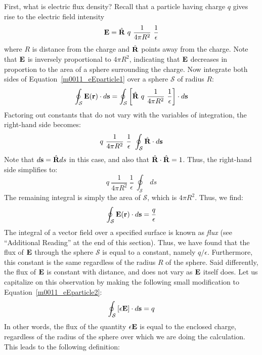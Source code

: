 First, what is electric flux density?
Recall that a particle having charge $q$ gives rise to the electric field intensity
%
\begin{equation}
{\bf E} = \hat{\bf R} ~ q ~ \frac{1}{4\pi R^2} ~ \frac{1}{\epsilon}
\label{m0011_eEparticle1}
\end{equation}
%
where $R$ is distance from the charge and $\hat{\bf R}$ points away from the charge.
Note that ${\bf E}$ is inversely proportional to $4\pi R^2$, indicating that ${\bf E}$ decreases in proportion to the area of a sphere surrounding the charge.
Now integrate both sides of Equation~\ref{m0011_eEparticle1} over a sphere $\mathcal{S}$ of radius $R$:
%
\begin{equation}
\oint_{\mathcal{S}} {\bf E}({\bf r}) \cdot d{\bf s} = \oint_{\mathcal{S}} \left[ \hat{\bf R} ~ q ~ \frac{1}{4\pi R^2} ~ \frac{1}{\epsilon} \right] \cdot d{\bf s}
\end{equation}
%
Factoring out constants that do not vary with the variables of integration, the right-hand side becomes:
%
\begin{equation}
q ~ \frac{1}{4\pi R^2} ~ \frac{1}{\epsilon} ~ \oint_{\mathcal{S}} \hat{\bf R} \cdot d{\bf s}
\nonumber
\end{equation}
%
Note that $d{\bf s}=\hat{\bf R}ds$ in this case, and also that $\hat{\bf R}\cdot\hat{\bf R}=1$.  Thus, the right-hand side simplifies to:
%
\begin{equation}
q ~ \frac{1}{4\pi R^2} ~ \frac{1}{\epsilon} ~ \oint_{\mathcal{S}} ~ds
\nonumber
\end{equation}
%
The remaining integral is simply the area of $\mathcal{S}$, which is $4\pi R^2$.  Thus, we find:
%
\begin{equation}
\oint_{\mathcal{S}} {\bf E}({\bf r}) \cdot d{\bf s} = \frac{q}{\epsilon}
\label{m0011_eEparticle2}
\end{equation}
%
The integral of a vector field over a specified surface is known as \emph{flux} 
(see ``Additional Reading'' at the end of this section). 
Thus, we have found that the flux of ${\bf E}$ through the sphere $\mathcal{S}$ is equal to a constant, namely $q/\epsilon$.
Furthermore, this constant is the same regardless of the radius $R$ of the sphere.
Said differently, the flux of ${\bf E}$ is constant with distance, and does not vary as ${\bf E}$ itself does.  
Let us capitalize on this observation by making the following small modification to Equation~\ref{m0011_eEparticle2}:
%
\begin{equation}
\oint_{\mathcal{S}} \left[\epsilon {\bf E}\right] \cdot d{\bf s} = q
\end{equation}
%
In other words, the flux of the quantity $\epsilon {\bf E}$ is equal to the enclosed charge, regardless of the radius of the sphere over which we are doing the calculation.
This leads to the following definition:

